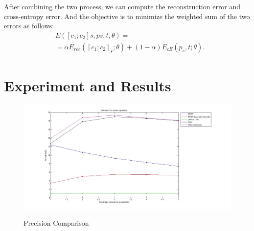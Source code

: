 \documentclass[dvips,9pt]{article}
\begin{document}
After combining the two process, we can compute the reconstruction error and cross-entropy error. And the objective is to minimize the weighted sum of the two errors as follows:
\begin{equation}
\begin{split}
 & E([c_{1}; c_{2}]s, ps, t, θ) = \\
 & = \alpha E_{rec}([c_{1}; c_{2}]_{s}; \theta) + (1 - \alpha)E_{cE}(p_{s}, t; \theta).
\\
 \end{split}
\end{equation}
	\section{Experiment and Results}
		\begin{figure}
			\centering
			\caption{Precision Comparison}
			\includegraphics[scale=0.3]{../baseline/precision.jpg}
            \label{precision}
		\end{figure}
\end{document}
